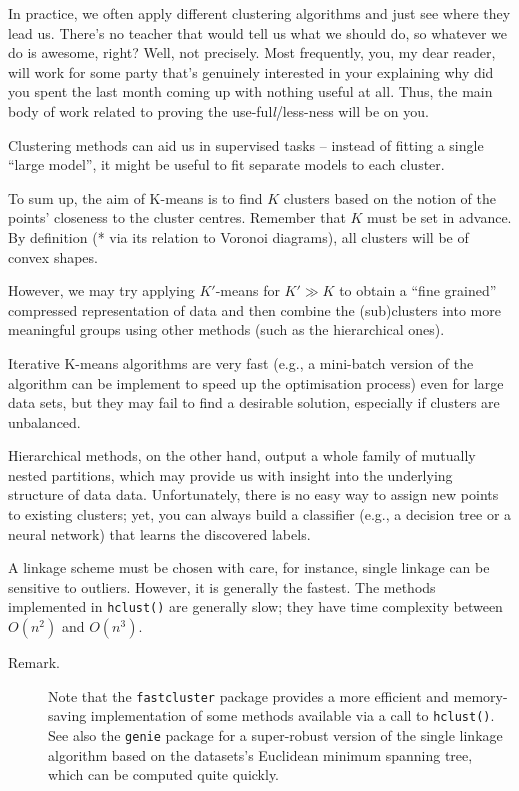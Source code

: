\documentclass[10pt,b5paper,krantz1]{krantz}
\begin{document}
In practice, we often apply different clustering algorithms
and just see where they lead us. There's no teacher that would
tell us what we should do, so whatever we do is awesome, right?
Well, not precisely. Most frequently, you, my dear reader, will work
for some party that's genuinely
interested in your explaining why did you spent the last month coming up
with nothing useful at all. Thus, the main body of work related to proving
the use-ful\emph{l}/less-ness will be on you.

Clustering methods can aid us in supervised tasks
-- instead of fitting a single ``large model'', it might be
useful to fit separate models to each cluster.

\bigskip

To sum up, the aim of K-means is to find
\(K\) clusters based on the notion of the points' closeness
to the cluster centres. Remember that \(K\) must be set in advance.
By definition (* via its relation to Voronoi diagrams),
all clusters will be of convex shapes.

However, we may try applying \(K'\)-means for \(K' \gg K\)
to obtain a ``fine grained'' compressed representation of data and then
combine the (sub)clusters into more meaningful groups
using other methods (such as the hierarchical ones).

Iterative K-means algorithms are very fast (e.g., a mini-batch
version of the algorithm can be implement to speed up the optimisation
process) even for large data sets,
but they may fail to find a desirable solution, especially if clusters
are unbalanced.

\bigskip

Hierarchical methods, on the other hand, output
a whole family of mutually nested partitions, which may provide us
with insight into the underlying structure of data data.
Unfortunately, there is no easy way to assign new points
to existing clusters; yet, you can always build a classifier
(e.g., a decision tree or a neural network) that learns
the discovered labels.

A linkage scheme must be chosen with care, for instance, single linkage
can be sensitive to outliers. However, it is generally the fastest.
The methods implemented in \texttt{hclust()} are generally slow; they have
time complexity between \(O(n^2)\) and \(O(n^3)\).

\begin{description}
\item[Remark.]
Note that the \texttt{fastcluster} package provides a more efficient
and memory-saving
implementation of some methods available via a call to \texttt{hclust()}.
See also the \texttt{genie} package for a super-robust version of the single linkage
algorithm based on the datasets's Euclidean minimum spanning tree,
which can be computed quite quickly.
\end{description}
\end{document}
